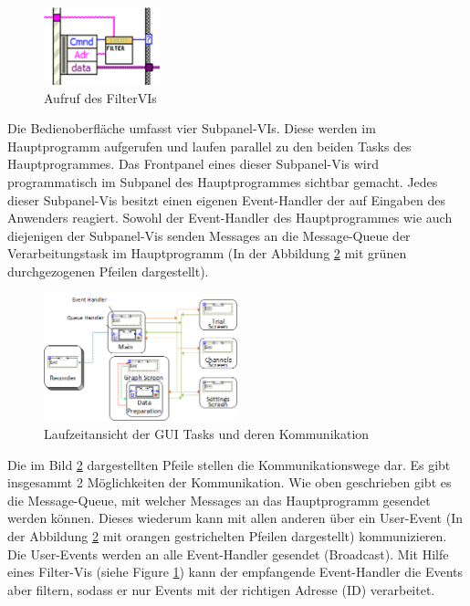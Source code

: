 \documentclass[10pt]{scrartcl}
\begin{document}
\begin{figure}
	\begin{center}
		\includegraphics[width=0.3\textwidth]{pictures/filterVI}
		\caption{Aufruf des FilterVIs}
		\label{fig:filterVI}
	\end{center}
\end{figure}
Die Bedienoberfläche umfasst vier Subpanel-VIs. Diese werden im Hauptprogramm aufgerufen und laufen parallel zu den beiden Tasks des Hauptprogrammes. Das \gls{Frontpanel} eines dieser Subpanel-Vis wird programmatisch im Subpanel des Hauptprogrammes sichtbar gemacht.  
Jedes dieser Subpanel-Vis besitzt einen eigenen Event-Handler der auf Eingaben des Anwenders reagiert. Sowohl der Event-Handler des Hauptprogrammes wie auch diejenigen der Subpanel-Vis senden Messages an die Message-Queue der Verarbeitungstask im Hauptprogramm (In der Abbildung \ref{fig:LaufzeitansichtUDA} mit grünen durchgezogenen Pfeilen dargestellt).





\begin{figure}
	\begin{center}
		\includegraphics[width=0.5\textwidth]{pictures/LaufzeitansichtMitRecorder}
		\caption{Laufzeitansicht der GUI Tasks und deren Kommunikation}
		\label{fig:LaufzeitansichtUDA}
	\end{center}
\end{figure}
Die im Bild \ref{fig:LaufzeitansichtUDA} dargestellten Pfeile stellen die Kommunikationswege dar. Es gibt insgesammt 2 Möglichkeiten der Kommunikation. Wie oben geschrieben gibt es die Message-Queue, mit welcher Messages an das Hauptprogramm gesendet werden können. Dieses wiederum kann mit allen anderen über ein User-Event (In der Abbildung \ref{fig:LaufzeitansichtUDA} mit orangen gestrichelten Pfeilen dargestellt) kommunizieren. Die User-Events werden an alle Event-Handler gesendet (Broadcast). Mit Hilfe eines Filter-Vis (siehe Figure \ref{fig:filterVI}) kann der empfangende Event-Handler die Events aber filtern, sodass er nur Events mit der richtigen Adresse (ID) verarbeitet.   
\end{document}
